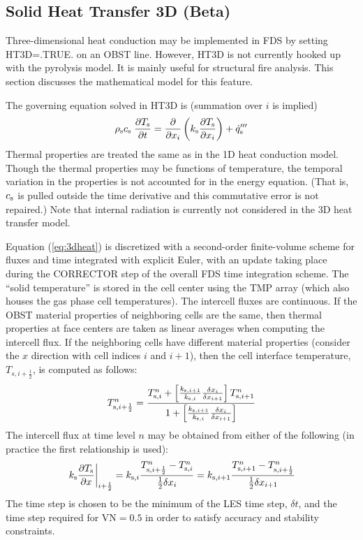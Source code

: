 \subsection{Solid Heat Transfer 3D (Beta)}
\label{sec:ht3d}

Three-dimensional heat conduction may be implemented in FDS by setting {\ct HT3D=.TRUE.} on an {\ct OBST} line.  However, {\ct HT3D} is not currently hooked up with the pyrolysis model.  It is mainly useful for structural fire analysis. This section discusses the mathematical model for this feature.

The governing equation solved in {\ct HT3D} is (summation over $i$ is implied)
\begin{equation}
  \rho_{\rm s} c_{\rm s} \; \frac{\partial T_{\rm s}}{\partial t} = \frac{\partial }{\partial x_i} \left( k_{\rm s} \frac{\partial T_{\rm s}}{\partial x_i} \right) + \dot{q}_{\rm s}'''
  \label{eq:3dheat}
\end{equation}
Thermal properties are treated the same as in the 1D heat conduction model.  Though the thermal properties may be functions of temperature, the temporal variation in the properties is not accounted for in the energy equation. (That is, $c_{\rm s}$ is pulled outside the time derivative and this commutative error is not repaired.)  Note that internal radiation is currently not considered in the 3D heat transfer model.

Equation (\ref{eq:3dheat}) is discretized with a second-order finite-volume scheme for fluxes and time integrated with explicit Euler, with an update taking place during the {\ct CORRECTOR} step of the overall FDS time integration scheme.  The ``solid temperature'' is stored in the cell center using the {\ct TMP} array (which also houses the gas phase cell temperatures).  The intercell fluxes are continuous.  If the {\ct OBST} material properties of neighboring cells are the same, then thermal properties at face centers are taken as linear averages when computing the intercell flux.  If the neighboring cells have different material properties (consider the $x$ direction with cell indices $i$ and $i+1$), then the cell interface temperature, $T_{s,i+\frac{1}{2}}$, is computed as follows:
\begin{equation}
\label{eq:interface_tmp}
T_{{\rm s},i+\frac{1}{2}}^n = \frac{T_{{\rm s},i}^n + \left[\frac{k_{{\rm s},i+1}}{k_{{\rm s},i}} \frac{\delta x_i}{\delta x_{i+1}}\right] T_{{\rm s},i+1}^n}{1 + \left[\frac{k_{{\rm s},i+1}}{k_{{\rm s},i}} \frac{\delta x_i}{\delta x_{i+1}}\right]}
\end{equation}
The intercell flux at time level $n$ may be obtained from either of the following (in practice the first relationship is used):
\begin{equation}
\label{eq:intercell_flux}
\left. k_{\rm s} \frac{\partial T_{\rm s}}{\partial x} \right|_{i+\frac{1}{2}} = k_{{\rm s},i} \frac{T_{{\rm s},i+\frac{1}{2}}^n - T_{{\rm s},i}^n}{\frac{1}{2}\delta x_i} = k_{{\rm s},i+1} \frac{T_{{\rm s},i+1}^n - T_{{\rm s},i+\frac{1}{2}}^n}{\frac{1}{2}\delta x_{i+1}}
\end{equation}
The time step is chosen to be the minimum of the LES time step, $\delta t$, and the time step required for $\mathrm{VN}=0.5$ in order to satisfy accuracy and stability constraints.

